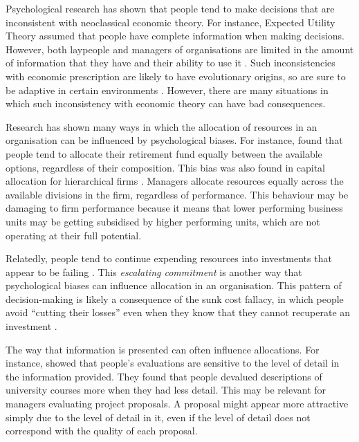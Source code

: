 \documentclass[a4paper, nobind, dvipsnames]{templates/ociamthesis}
\theoremstyle{definition}
\theoremstyle{definition}
\theoremstyle{definition}
\theoremstyle{definition}
\theoremstyle{remark}
\begin{document}
Psychological research has shown that people tend to make decisions that are
inconsistent with neoclassical economic theory. For instance, Expected Utility
Theory \autocites[EUT;][]{friedman1948,vonneumann1944} assumed that people have complete
information when making decisions. However, both laypeople and managers of
organisations are limited in the amount of information that they have and their
ability to use it \autocite{simon1955,cyert1956}. Such inconsistencies with economic
prescription are likely to have evolutionary origins, so are sure to be adaptive
in certain environments \autocite{haselton2009,gigerenzer2008}. However, there are
many situations in which such inconsistency with economic theory can have bad
consequences.

Research has shown many ways in which the allocation of resources in an
organisation can be influenced by psychological biases. For instance,
\textcite{benartzi2001} found that people tend to allocate their retirement fund equally
between the available options, regardless of their composition. This bias was
also found in capital allocation for hierarchical firms \autocite{bardolet2011}.
Managers allocate resources equally across the available divisions in the firm,
regardless of performance. This behaviour may be damaging to firm performance
because it means that lower performing business units may be getting subsidised
by higher performing units, which are not operating at their full potential.

Relatedly, people tend to continue expending resources into investments that
appear to be failing \autocite{staw1981}. This \emph{escalating commitment} is another way
that psychological biases can influence allocation in an organisation. This
pattern of decision-making is likely a consequence of the sunk cost fallacy, in
which people avoid ``cutting their losses'' even when they know that they cannot
recuperate an investment \autocite{parayre1995}.

The way that information is presented can often influence allocations. For
instance, \textcite{yates1978} showed that people's evaluations are sensitive to the level
of detail in the information provided. They found that people devalued
descriptions of university courses more when they had less detail. This may be
relevant for managers evaluating project proposals. A proposal might appear more
attractive simply due to the level of detail in it, even if the level of detail
does not correspond with the quality of each proposal.
\end{document}
